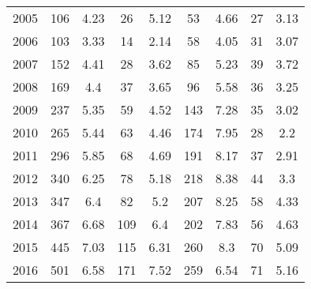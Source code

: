 \begin{table}[htbp]
\begin{tabular}{l*{8}{c}}
2005      &      106&     4.23&       26&     5.12&       53&     4.66&       27&     3.13\\
2006      &      103&     3.33&       14&     2.14&       58&     4.05&       31&     3.07\\
2007      &      152&     4.41&       28&     3.62&       85&     5.23&       39&     3.72\\
2008      &      169&      4.4&       37&     3.65&       96&     5.58&       36&     3.25\\
2009      &      237&     5.35&       59&     4.52&      143&     7.28&       35&     3.02\\
2010      &      265&     5.44&       63&     4.46&      174&     7.95&       28&      2.2\\
2011      &      296&     5.85&       68&     4.69&      191&     8.17&       37&     2.91\\
2012      &      340&     6.25&       78&     5.18&      218&     8.38&       44&      3.3\\
2013      &      347&      6.4&       82&      5.2&      207&     8.25&       58&     4.33\\
2014      &      367&     6.68&      109&      6.4&      202&     7.83&       56&     4.63\\
2015      &      445&     7.03&      115&     6.31&      260&      8.3&       70&     5.09\\
2016      &      501&     6.58&      171&     7.52&      259&     6.54&       71&     5.16\\
\hline\hline
\end{tabular}
\end{table}

